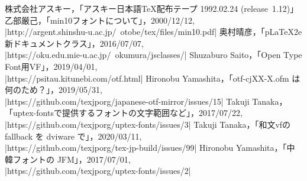 \documentclass[a4paper,11pt,nomag]{jsarticle}
\begin{document}
\begin{thebibliography}{99}
   株式会社アスキー，「アスキー日本語\TeX 配布テープ 1992.02.24 (release~1.12)」
   乙部厳己，「min10フォントについて」，2000/12/12,\\
   |http://argent.shinshu-u.ac.jp/~otobe/tex/files/min10.pdf|
   奥村晴彦，「pLaTeX2e 新ドキュメントクラス」，2016/07/07,\\
   |https://oku.edu.mie-u.ac.jp/~okumura/jsclasses/|
   Shuzaburo Saito，「Open Type Font用VF」，2019/04/01,\\
   |https://psitau.kitunebi.com/otf.html|
   Hironobu Yamashita，「otf-cjXX-X.ofm は何のため？」，2019/05/31,\\
   |https://github.com/texjporg/japanese-otf-mirror/issues/15|
   Takuji Tanaka，「uptex-fontsで提供するフォントの文字範囲など」，2017/07/22,\\
   |https://github.com/texjporg/uptex-fonts/issues/3|
   Takuji Tanaka，「和文vfの fallback を dviware で」，2020/03/11,\\
   |https://github.com/texjporg/tex-jp-build/issues/99|
   Hironobu Yamashita，「中韓フォントの JFM」，2017/07/01,\\
   |https://github.com/texjporg/uptex-fonts/issues/2|
\end{thebibliography}
\end{document}
